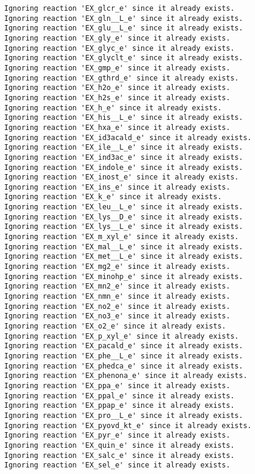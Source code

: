 \documentclass[
  letterpaper,
  DIV=11,
  numbers=noendperiod]{scrartcl}
\begin{document}
\begin{verbatim}
Ignoring reaction 'EX_glcr_e' since it already exists.
Ignoring reaction 'EX_gln__L_e' since it already exists.
Ignoring reaction 'EX_glu__L_e' since it already exists.
Ignoring reaction 'EX_gly_e' since it already exists.
Ignoring reaction 'EX_glyc_e' since it already exists.
Ignoring reaction 'EX_glyclt_e' since it already exists.
Ignoring reaction 'EX_gmp_e' since it already exists.
Ignoring reaction 'EX_gthrd_e' since it already exists.
Ignoring reaction 'EX_h2o_e' since it already exists.
Ignoring reaction 'EX_h2s_e' since it already exists.
Ignoring reaction 'EX_h_e' since it already exists.
Ignoring reaction 'EX_his__L_e' since it already exists.
Ignoring reaction 'EX_hxa_e' since it already exists.
Ignoring reaction 'EX_id3acald_e' since it already exists.
Ignoring reaction 'EX_ile__L_e' since it already exists.
Ignoring reaction 'EX_ind3ac_e' since it already exists.
Ignoring reaction 'EX_indole_e' since it already exists.
Ignoring reaction 'EX_inost_e' since it already exists.
Ignoring reaction 'EX_ins_e' since it already exists.
Ignoring reaction 'EX_k_e' since it already exists.
Ignoring reaction 'EX_leu__L_e' since it already exists.
Ignoring reaction 'EX_lys__D_e' since it already exists.
Ignoring reaction 'EX_lys__L_e' since it already exists.
Ignoring reaction 'EX_m_xyl_e' since it already exists.
Ignoring reaction 'EX_mal__L_e' since it already exists.
Ignoring reaction 'EX_met__L_e' since it already exists.
Ignoring reaction 'EX_mg2_e' since it already exists.
Ignoring reaction 'EX_minohp_e' since it already exists.
Ignoring reaction 'EX_mn2_e' since it already exists.
Ignoring reaction 'EX_nmn_e' since it already exists.
Ignoring reaction 'EX_no2_e' since it already exists.
Ignoring reaction 'EX_no3_e' since it already exists.
Ignoring reaction 'EX_o2_e' since it already exists.
Ignoring reaction 'EX_p_xyl_e' since it already exists.
Ignoring reaction 'EX_pacald_e' since it already exists.
Ignoring reaction 'EX_phe__L_e' since it already exists.
Ignoring reaction 'EX_phedca_e' since it already exists.
Ignoring reaction 'EX_phenona_e' since it already exists.
Ignoring reaction 'EX_ppa_e' since it already exists.
Ignoring reaction 'EX_ppal_e' since it already exists.
Ignoring reaction 'EX_ppap_e' since it already exists.
Ignoring reaction 'EX_pro__L_e' since it already exists.
Ignoring reaction 'EX_pyovd_kt_e' since it already exists.
Ignoring reaction 'EX_pyr_e' since it already exists.
Ignoring reaction 'EX_quin_e' since it already exists.
Ignoring reaction 'EX_salc_e' since it already exists.
Ignoring reaction 'EX_sel_e' since it already exists.

\end{verbatim}
\end{document}
